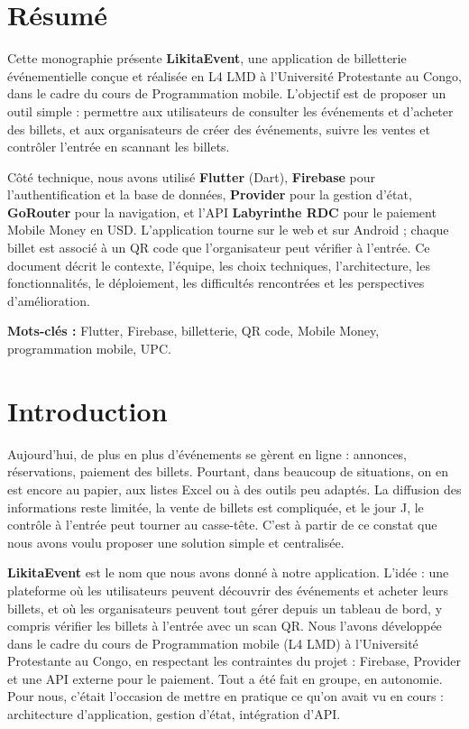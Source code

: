 \documentclass[11pt,a4paper,oneside]{article}
\begin{document}
\section*{Résumé}

Cette monographie présente \textbf{LikitaEvent}, une application de billetterie événementielle conçue et réalisée en L4 LMD à l'Université Protestante au Congo, dans le cadre du cours de Programmation mobile. L'objectif est de proposer un outil simple : permettre aux utilisateurs de consulter les événements et d'acheter des billets, et aux organisateurs de créer des événements, suivre les ventes et contrôler l'entrée en scannant les billets.

Côté technique, nous avons utilisé \textbf{Flutter} (Dart), \textbf{Firebase} pour l'authentification et la base de données, \textbf{Provider} pour la gestion d'état, \textbf{GoRouter} pour la navigation, et l'API \textbf{Labyrinthe RDC} pour le paiement Mobile Money en USD. L'application tourne sur le web et sur Android ; chaque billet est associé à un QR code que l'organisateur peut vérifier à l'entrée. Ce document décrit le contexte, l'équipe, les choix techniques, l'architecture, les fonctionnalités, le déploiement, les difficultés rencontrées et les perspectives d'amélioration.

\textbf{Mots-clés :} Flutter, Firebase, billetterie, QR code, Mobile Money, programmation mobile, UPC.

\section{Introduction}
\label{sec:intro}

Aujourd'hui, de plus en plus d'événements se gèrent en ligne : annonces, réservations, paiement des billets. Pourtant, dans beaucoup de situations, on en est encore au papier, aux listes Excel ou à des outils peu adaptés. La diffusion des informations reste limitée, la vente de billets est compliquée, et le jour J, le contrôle à l'entrée peut tourner au casse-tête. C'est à partir de ce constat que nous avons voulu proposer une solution simple et centralisée.

\textbf{LikitaEvent} est le nom que nous avons donné à notre application. L'idée : une plateforme où les utilisateurs peuvent découvrir des événements et acheter leurs billets, et où les organisateurs peuvent tout gérer depuis un tableau de bord, y compris vérifier les billets à l'entrée avec un scan QR. Nous l'avons développée dans le cadre du cours de Programmation mobile (L4 LMD) à l'Université Protestante au Congo, en respectant les contraintes du projet : Firebase, Provider et une API externe pour le paiement. Tout a été fait en groupe, en autonomie. Pour nous, c'était l'occasion de mettre en pratique ce qu'on avait vu en cours : architecture d'application, gestion d'état, intégration d'API.
\end{document}
